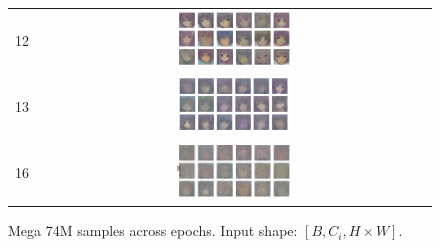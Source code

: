 \documentclass[twocolumn,superscriptaddress,aps]{revtex4-1}
\begin{document}
\begin{figure}[H]
\begin{tabular}{c|c}
        12 & \includegraphics[width=0.3\textwidth]{figures/Screenshot from 2025-08-07 00-02-35.png} \\
        13 & \includegraphics[width=0.3\textwidth]{figures/Screenshot from 2025-08-07 10-10-59.png} \\
        16 & \includegraphics[width=0.3\textwidth]{figures/74M-badattention-epoch16.png} \\
        \hline
    \end{tabular}
    \caption{Mega 74M samples across epochs. Input shape: $[B, C_i, H \times W]$.}

\end{figure}
\end{document}
